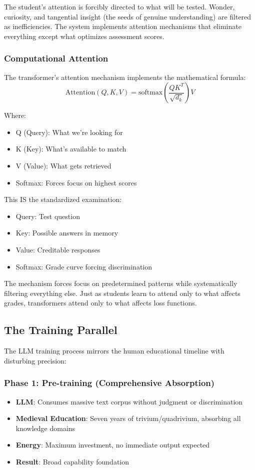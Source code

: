 The student's attention is forcibly directed to what will be tested. Wonder, curiosity, and tangential insight (the seeds of genuine understanding) are filtered as inefficiencies. The system implements attention mechanisms that eliminate everything except what optimizes assessment scores.

\subsubsection{Computational Attention}

The transformer's attention mechanism implements the mathematical formula:
\begin{equation}
\text{Attention}(Q,K,V) = \text{softmax}\left(\frac{QK^T}{\sqrt{d_k}}\right)V
\end{equation}

Where:
\begin{itemize}
\item Q (Query): What we're looking for
\item K (Key): What's available to match
\item V (Value): What gets retrieved
\item Softmax: Forces focus on highest scores
\end{itemize}

This IS the standardized examination:
\begin{itemize}
\item Query: Test question
\item Key: Possible answers in memory
\item Value: Creditable responses
\item Softmax: Grade curve forcing discrimination
\end{itemize}

The mechanism forces focus on predetermined patterns while systematically filtering everything else. Just as students learn to attend only to what affects grades, transformers attend only to what affects loss functions.

\subsection{The Training Parallel}

The LLM training process mirrors the human educational timeline with disturbing precision:

\subsubsection{Phase 1: Pre-training (Comprehensive Absorption)}
\begin{itemize}
\item \textbf{LLM}: Consumes massive text corpus without judgment or discrimination
\item \textbf{Medieval Education}: Seven years of trivium/quadrivium, absorbing all knowledge domains
\item \textbf{Energy}: Maximum investment, no immediate output expected
\item \textbf{Result}: Broad capability foundation
\end{itemize}

